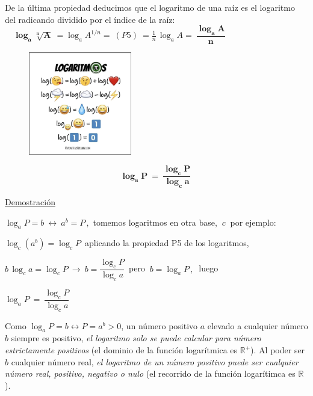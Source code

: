 De la última propiedad deducimos que el logaritmo de una raíz es el logaritmo del radicando dividido por el índice de la raíz:
$\quad \boldsymbol{ \log_a \sqrt[n]{A} }\ = \log_a A^{1/n} = \ (P5) \ = \frac 1 n \, \log_a A=\ \boldsymbol{ \dfrac{\log_aA}{n} }$ 


\begin{figure}[H]
	\centering
	\includegraphics[width=0.4\textwidth]{img-reales/reales20.png}
	\end{figure}


\vspace{5mm}

\begin{theorem}
	
	$$\boxed{\ \boldsymbol{ \log_aP\ = \ \dfrac{\log_c P}{\log_c a} } \ \ }$$
\end{theorem}

\underline{Demostración} 

$\log_aP=b\ \leftrightarrow \ a^b=P\, ,  $ tomemos logaritmos en otra base, $ \ c\ $ por ejemplo:

$\log_c (a^b) = \log_c P \, $ aplicando la propiedad P5 de los logaritmos,

$b\, \log_c a = \log_c P \ \to \ b=\dfrac{\log_c P}{\log_c a} \, $ pero $\ b=\log_aP\, , \  $ luego

$\log_aP\ = \ \dfrac{\log_c P}{\log_c a}$ \QED

\vspace{5mm}

Como $\log_aP=b \leftrightarrow P=a^b>0$, un número positivo $a$ elevado a cualquier número $b$ siempre es positivo, \emph{el logaritmo solo se puede calcular para número estrictamente positivos} (el dominio de la función logarítmica es $\mathbb R^+$). Al poder ser $b$ cualquier número real, \emph{el logaritmo de un número positivo puede ser cualquier número real, positivo, negativo o nulo} (el recorrido de la función logarítimca es $\mathbb R$). 

\vspace{5mm}

